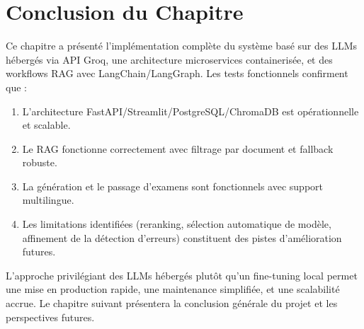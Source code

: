 \section{Conclusion du Chapitre}

Ce chapitre a présenté l'implémentation complète du système basé sur des LLMs hébergés via API Groq, une architecture microservices containerisée, et des workflows RAG avec LangChain/LangGraph. Les tests fonctionnels confirment que :

\begin{enumerate}
    \item L'architecture FastAPI/Streamlit/PostgreSQL/ChromaDB est opérationnelle et scalable.
    \item Le RAG fonctionne correctement avec filtrage par document et fallback robuste.
    \item La génération et le passage d'examens sont fonctionnels avec support multilingue.
    \item Les limitations identifiées (reranking, sélection automatique de modèle, affinement de la détection d'erreurs) constituent des pistes d'amélioration futures.
\end{enumerate}

L'approche privilégiant des LLMs hébergés plutôt qu'un fine-tuning local permet une mise en production rapide, une maintenance simplifiée, et une scalabilité accrue. Le chapitre suivant présentera la conclusion générale du projet et les perspectives futures.
